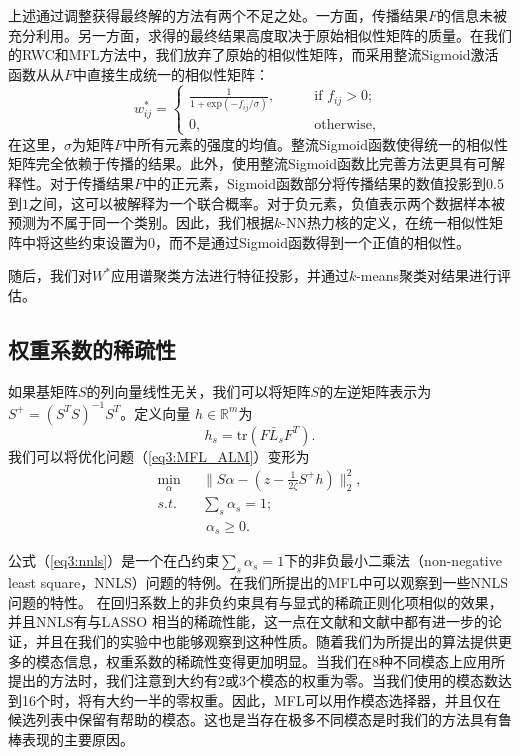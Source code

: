 上述通过调整获得最终解的方法有两个不足之处。一方面，传播结果$ {F} $的信息未被充分利用。另一方面，求得的最终结果高度取决于原始相似性矩阵的质量。在我们的RWC和MFL方法中，我们放弃了原始的相似性矩阵，而采用整流Sigmoid激活函数从从$F$中直接生成统一的相似性矩阵：
\begin{equation}
w^*_{ij} = 
\begin{cases}
\frac{1}{1+\text{exp}(-f_{ij}/\sigma)}, \qquad &\text{if }f_{ij}>0;\\
0, &\text{otherwise, }
\end{cases}
\label{eq3:rSa}
\end{equation}
在这里，$ \sigma  $为矩阵$F$中所有元素的强度的均值。整流Sigmoid函数使得统一的相似性矩阵完全依赖于传播的结果。此外，使用整流Sigmoid函数比完善方法更具有可解释性。对于传播结果$F$中的正元素，Sigmoid函数部分将传播结果的数值投影到$0.5$到$1$之间，这可以被解释为一个联合概率。对于负元素，负值表示两个数据样本被预测为不属于同一个类别。因此，我们根据$k$-NN热力核的定义，在统一相似性矩阵中将这些约束设置为$0$，而不是通过Sigmoid函数得到一个正值的相似性。

随后，我们对$ W^* $应用谱聚类方法\cite{von2007tutorial}进行特征投影，并通过$ k$-means聚类对结果进行评估。

\subsection{权重系数的稀疏性}
\label{sec3:dis}
如果基矩阵$S$的列向量线性无关，我们可以将矩阵$S$的左逆矩阵表示为$ {S} ^+ = ({S}^T{S})^{-1}{S}^T$。定义向量 $ {h} \in  \mathbb{R}^{m} $为
\begin{equation}
h_s = \text{tr}({F} \bar{{L}}_s{F}^T).
\end{equation}
我们可以将优化问题（\ref{eq3:MFL_ALM}）变形为
\begin{equation}
\begin{split}
\mathop{\mathrm{min}}_{{\alpha}}\;&\|{S}{\alpha} - ( {z} - \frac{1}{2\zeta}{S}^+ {h}) \|_2^2,\\
s.t.\quad& \sum_s \alpha_s = 1;\\ &\; \alpha_s \ge 0.
\label{eq3:nnls}
\end{split}
\end{equation}

公式（\ref{eq3:nnls}）是一个在凸约束$ \sum_s \alpha_s = 1 $下的非负最小二乘法（non-negative least square，NNLS）问题的特例。在我们所提出的MFL中可以观察到一些NNLS问题的特性。
在回归系数上的非负约束具有与显式的稀疏正则化项相似的效果，并且NNLS有与LASSO \cite{tibshirani1996regression}相当的稀疏性能，这一点在文献\parencite{slawski2011sparse}和文献\parencite{slawski2013non}中都有进一步的论证，并且在我们的实验中也能够观察到这种性质。随着我们为所提出的算法提供更多的模态信息，权重系数的稀疏性变得更加明显。当我们在8种不同模态上应用所提出的方法时，我们注意到大约有2或3个模态的权重为零。当我们使用的模态数达到16个时，将有大约一半的零权重。因此，MFL可以用作模态选择器，并且仅在候选列表中保留有帮助的模态。这也是当存在极多不同模态是时我们的方法具有鲁棒表现的主要原因。

